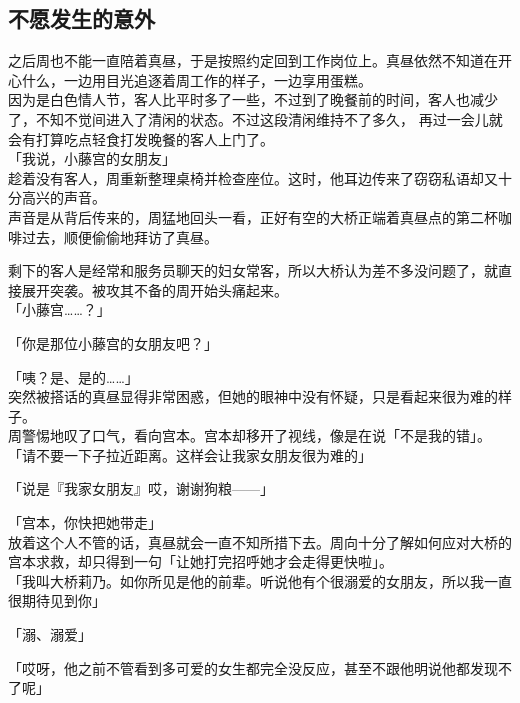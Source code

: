 \subsection{不愿发生的意外}

之后周也不能一直陪着真昼，于是按照约定回到工作岗位上。真昼依然不知道在开心什么，一边用目光追逐着周工作的样子，一边享用蛋糕。\\

因为是白色情人节，客人比平时多了一些，不过到了晚餐前的时间，客人也减少了，不知不觉间进入了清闲的状态。不过这段清闲维持不了多久， 再过一会儿就会有打算吃点轻食打发晚餐的客人上门了。\\

「我说，小藤宫的女朋友」\\

趁着没有客人，周重新整理桌椅并检查座位。这时，他耳边传来了窃窃私语却又十分高兴的声音。\\

声音是从背后传来的，周猛地回头一看，正好有空的大桥正端着真昼点的第二杯咖啡过去，顺便偷偷地拜访了真昼。

剩下的客人是经常和服务员聊天的妇女常客，所以大桥认为差不多没问题了，就直接展开突袭。被攻其不备的周开始头痛起来。\\

「小藤宫……？」

「你是那位小藤宫的女朋友吧？」

「咦？是、是的……」\\

突然被搭话的真昼显得非常困惑，但她的眼神中没有怀疑，只是看起来很为难的样子。\\

周警惕地叹了口气，看向宫本。宫本却移开了视线，像是在说「不是我的错」。\\

「请不要一下子拉近距离。这样会让我家女朋友很为难的」

「说是『我家女朋友』哎，谢谢狗粮——」

「宫本，你快把她带走」\\

放着这个人不管的话，真昼就会一直不知所措下去。周向十分了解如何应对大桥的宫本求救，却只得到一句「让她打完招呼她才会走得更快啦」。\\

「我叫大桥莉乃。如你所见是他的前辈。听说他有个很溺爱的女朋友，所以我一直很期待见到你」

「溺、溺爱」

「哎呀，他之前不管看到多可爱的女生都完全没反应，甚至不跟他明说他都发现不了呢」

